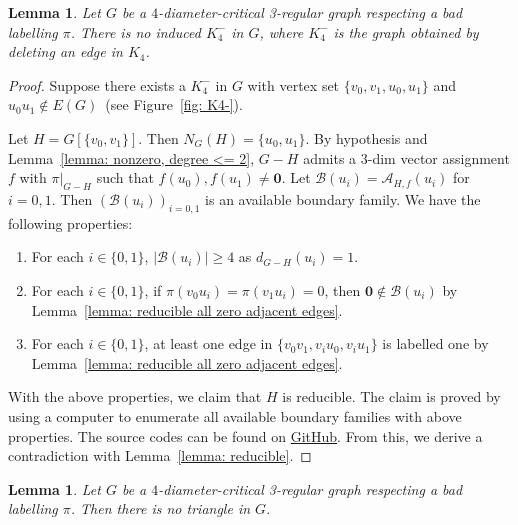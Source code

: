 \documentclass[
final
]{dmtcs-episciences}
\newtheorem{lemma}[theorem]{Lemma}
\begin{document}
\begin{lemma}\label{lemma: reducible K4-}
Let $G$ be a $4$-diameter-critical 3-regular graph respecting a bad labelling $\pi$.
There is no induced $K_4^-$ in $G$, where $K_4^-$ is the graph obtained by deleting an edge in $K_4$.
\end{lemma}

\begin{proof}
    Suppose there exists a $K_4^-$ in $G$ with vertex set $\{v_0,v_1,u_0,u_1\}$ and $u_0u_1 \notin E(G)$~(see Figure~\ref{fig: K4-}).

    Let $H = G[\{v_0,v_1\}]$. Then $N_G(H) = \{u_0, u_1\}$. By hypothesis and Lemma~\ref{lemma: nonzero, degree <= 2}, $G-H$ admits a $3$-dim vector assignment $f$  with $\pi|_{G-H}$ such that $f(u_0), f(u_1) \neq \mathbf{0}$.
    Let $\mathcal{B}(u_i) = \mathcal{A}_{H,f}(u_i)$ for $i=0,1$. Then ${(\mathcal{B}(u_i))}_{i=0,1}$ is an available boundary family.
    We have the following properties:
    \begin{enumerate}
        \item For each $i\in \{0,1\}$, $|\mathcal{B}(u_i) | \ge 4$ as $d_{G-H}(u_i) = 1$.
        \item For each $i\in \{0,1\}$, if $\pi(v_0u_i) = \pi(v_1u_i) = 0$, then $\mathbf{0} \notin \mathcal{B}(u_i)$ by Lemma~\ref{lemma: reducible all zero adjacent edges}.
        \item For each $i\in \{0,1\}$, at least one edge in $\{v_0v_{1}, v_i u_0, v_i u_1\}$ is labelled one by Lemma~\ref{lemma: reducible all zero adjacent edges}.
    \end{enumerate}

    With the above properties, we claim that $H$ is reducible.
    The claim is proved by using a computer to enumerate all available boundary families with above properties.
    The source codes can be found on \href{https://github.com/handsome12138/InversionDiameter}{GitHub}.
    From this, we derive a contradiction with Lemma~\ref{lemma: reducible}.
\end{proof}

\begin{lemma}\label{lemma: reducible C3}
Let $G$ be a $4$-diameter-critical 3-regular graph respecting a bad labelling $\pi$.
Then there is no triangle in $G$.
\end{lemma}
\end{document}
